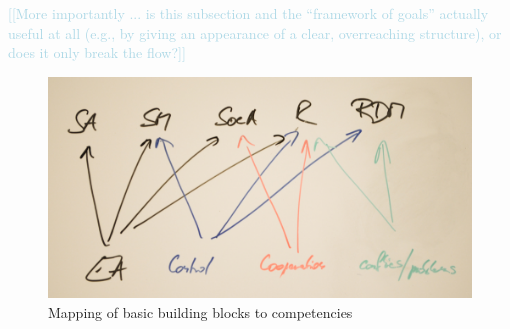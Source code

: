 \documentclass[prodmode,acmtochi]{acmsmall}
\newcommand{\todo}[1]{\textrm{\textrm{\textcolor{LightBlue}{[[#1]]}}}}
\begin{document}
 \todo{More importantly ... is this subsection and the ``framework of goals'' actually useful at all (e.g., by giving an appearance of a clear, overreaching structure), or does it only break the flow?}




%

\begin{figure}
  \centering
        \includegraphics[width=0.9\columnwidth]{images/strategiesMapping}
        \caption{Mapping of basic building blocks to competencies}
        \label{fig:strmap}
\end{figure}
\end{document}

